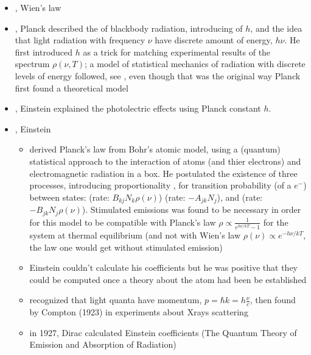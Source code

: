 \documentclass[letterpaper,10pt,english]{jupyterBook}
\begin{document}
\begin{itemize}
\item {} 
, Wien’s law

\item {} 
, Planck described the  of black\sphinxhyphen{}body radiation, introducing of \(h\), and the idea that light radiation with frequency \(\nu\) have discrete amount of energy, \(h \nu\). He first introduced \(h\) as a trick for matching experimental results of the spectrum \(\rho(\nu, T)\); a model of statistical mechanics of radiation with discrete levels of energy followed, see {\hyperref[\detokenize{ch/statistical-mechanics/notes:statistical-mechanics-notes-distributions-be}]{}}, even though that was the original way Planck first found a theoretical model

\item {} 
, Einstein explained the photolectric effects using Planck constant \(h\).

\item {} 
, Einstein
\begin{itemize}
\item {} 
\sphinxAtStartPar
derived Planck’s law from Bohr’s atomic model, using a (quantum) statistical approach to the interaction of atoms (and thier electrons) and electromagnetic radiation in a box. He postulated the existence of three processes, introducing proportionality , for transition probability (of a \(e^-\)) between states:  (rate: \(B_{kj} N_k \rho(\nu)\))  (rate: \(-A_{jk} N_j\)), and  (rate: \(- B_{jk} N_j \rho(\nu)\)). Stimulated emissions was found to be necessary in order for this model to be compatible with Planck’s law \(\rho \propto \frac{1}{e^{h\nu/k T}-1}\) for the system at thermal equilibrium (and not with Wien’s law \(\rho(\nu) \propto e^{-h \nu/ k T}\), the law one would get without stimulated emission)

\item {} 
\sphinxAtStartPar
Einstein couldn’t calculate his coefficients but he was positive that they could be computed once a theory about the atom had been be established

\item {} 
\sphinxAtStartPar
recognized that light quanta have momentum, \(p = \hbar k = h \frac{\nu}{c}\), then found by Compton (1923) in experiments about X\sphinxhyphen{}rays scattering

\item {} 
\sphinxAtStartPar
in 1927, Dirac calculated Einstein coefficients (The Quantum Theory of Emission and Absorption of Radiation)

\end{itemize}

\end{itemize}
\end{document}
